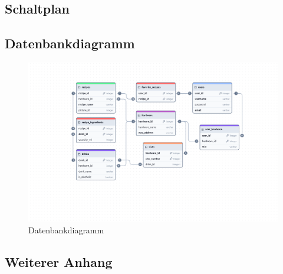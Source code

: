 
\subsection{Schaltplan}

\newpage



\newpage
\subsection{Datenbankdiagramm}

\begin{figure}[H]
  \centering
\includegraphics[height=0.9\textwidth, angle=90]{graphics/schemes/postgres_db_scheme.png}
  \caption{Datenbankdiagramm}
  \label{fig:database_diagram}
\end{figure}

\newpage

\subsection{Weiterer Anhang}